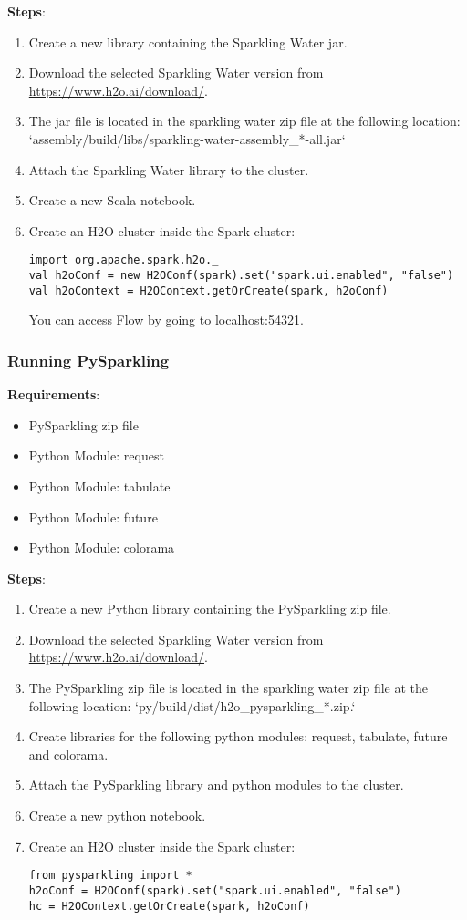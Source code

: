 \textbf{Steps}:
\begin{enumerate}
\item Create a new library containing the Sparkling Water jar.
\item Download the selected Sparkling Water version from \url{https://www.h2o.ai/download/}.
\item The jar file is located in the sparkling water zip file at the following location: `assembly/build/libs/sparkling-water-assembly\_*-all.jar`
\item Attach the Sparkling Water library to the cluster.
\item Create a new Scala notebook.
\item Create an H2O cluster inside the Spark cluster:
\begin{lstlisting}[style=Scala]
import org.apache.spark.h2o._
val h2oConf = new H2OConf(spark).set("spark.ui.enabled", "false")
val h2oContext = H2OContext.getOrCreate(spark, h2oConf)
\end{lstlisting}
You can access Flow by going to localhost:54321.
\end{enumerate}

\newpage
\subsubsection{Running PySparkling}

\textbf{Requirements}:
\begin{itemize}
\item PySparkling zip file
\item Python Module: request
\item Python Module: tabulate
\item Python Module: future
\item Python Module: colorama
\end{itemize}

\textbf{Steps}:
\begin{enumerate}
\item Create a new Python library containing the PySparkling zip file.
\item Download the selected Sparkling Water version from \url{https://www.h2o.ai/download/}.
\item The PySparkling zip file is located in the sparkling water zip file at the following location: `py/build/dist/h2o\_pysparkling\_*.zip.`
\item Create libraries for the following python modules: request, tabulate, future and colorama.
\item Attach the PySparkling library and python modules to the cluster.
\item Create a new python notebook.
\item Create an H2O cluster inside the Spark cluster:
\begin{lstlisting}[style=Python]
from pysparkling import *
h2oConf = H2OConf(spark).set("spark.ui.enabled", "false")
hc = H2OContext.getOrCreate(spark, h2oConf)
\end{lstlisting}

\end{enumerate}


